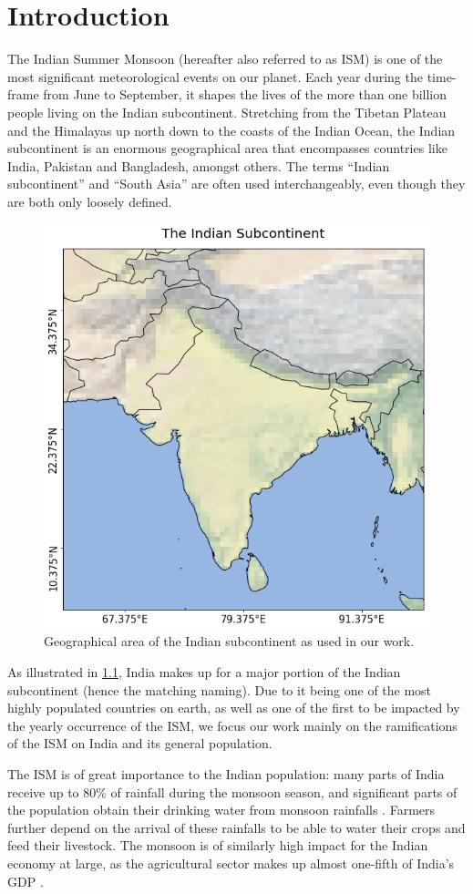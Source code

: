 \chapter{Introduction}
\label{c:introduction}

The Indian Summer Monsoon (hereafter also referred to as ISM) is one of the most significant meteorological events on our planet. Each year during the time-frame from June to September, it shapes the lives of the more than one billion people living on the Indian subcontinent. Stretching from the Tibetan Plateau and the Himalayas up north down to the coasts of the Indian Ocean, the Indian subcontinent is an enormous geographical area that encompasses countries like India, Pakistan and Bangladesh, amongst others. The terms ``Indian subcontinent'' and ``South Asia'' are often used interchangeably, even though they are both only loosely defined.

\begin{figure}[h]
  \centering
  \includegraphics[width=0.3\linewidth]{./99_appendix/img/area_overview}
  \caption{Geographical area of the Indian subcontinent as used in our work.}
  \label{fig:the_indian_subcontinent}
\end{figure}

As illustrated in \cref{fig:the_indian_subcontinent}, India makes up for a major portion of the Indian subcontinent (hence the matching naming). Due to it being one of the most highly populated countries on earth, as well as one of the first to be impacted by the yearly occurrence of the ISM, we focus our work mainly on the ramifications of the ISM on India and its general population.

The ISM is of great importance to the Indian population: many parts of India receive up to 80\% of rainfall during the monsoon season, and significant parts of the population obtain their drinking water from monsoon rainfalls \citep{Stolbova.2015}. Farmers further depend on the arrival of these rainfalls to be able to water their crops and feed their livestock. The monsoon is of similarly high impact for the Indian economy at large, as the agricultural sector makes up almost one-fifth of India's GDP \citep{CentralIntelligenceAgency.05.01.2018}.

